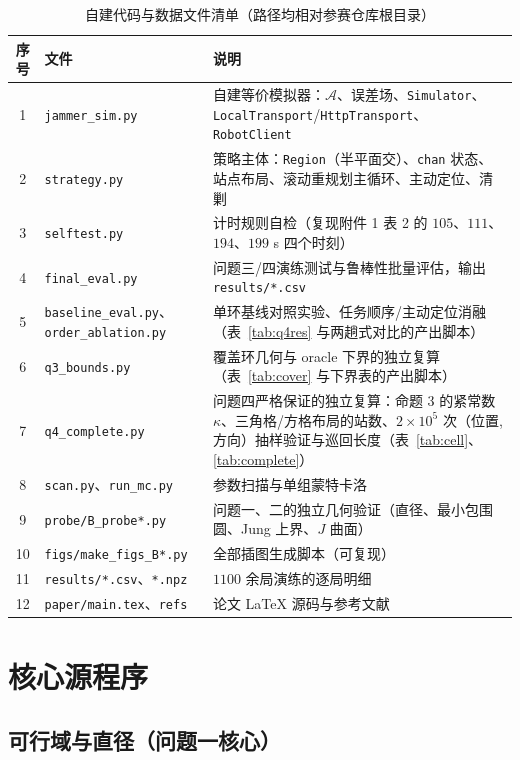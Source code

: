 \begin{table}[H]
\centering
\caption{自建代码与数据文件清单（路径均相对参赛仓库根目录）}
\label{tab:files}
\footnotesize
\setlength{\tabcolsep}{4pt}
\begin{tabular}{@{}cl >{\raggedright\arraybackslash}p{7.4cm}@{}}
\toprule
序号 & 文件 & 说明 \\
\midrule
1 & \texttt{jammer\_sim.py} & 自建等价模拟器：$\mathcal A$、误差场、\texttt{Simulator}、\texttt{LocalTransport}/\texttt{HttpTransport}、\texttt{RobotClient} \\
2 & \texttt{strategy.py} & 策略主体：\texttt{Region}（半平面交）、\texttt{chan} 状态、站点布局、滚动重规划主循环、主动定位、清剿 \\
3 & \texttt{selftest.py} & 计时规则自检（复现附件 1 表 2 的 $105$、$111$、$194$、$199$ s 四个时刻） \\
4 & \texttt{final\_eval.py} & 问题三/四演练测试与鲁棒性批量评估，输出 \texttt{results/*.csv} \\
5 & \texttt{baseline\_eval.py}、\texttt{order\_ablation.py} & 单环基线对照实验、任务顺序/主动定位消融（表~\ref{tab:q4res} 与两趟式对比的产出脚本） \\
6 & \texttt{q3\_bounds.py} & 覆盖环几何与 oracle 下界的独立复算（表~\ref{tab:cover} 与下界表的产出脚本） \\
7 & \texttt{q4\_complete.py} & 问题四严格保证的独立复算：命题 3 的紧常数 $\kappa$、三角格/方格布局的站数、$2\times10^5$ 次（位置, 方向）抽样验证与巡回长度（表~\ref{tab:cell}、\ref{tab:complete}） \\
8 & \texttt{scan.py}、\texttt{run\_mc.py} & 参数扫描与单组蒙特卡洛 \\
9 & \texttt{probe/B\_probe*.py} & 问题一、二的独立几何验证（直径、最小包围圆、Jung 上界、$J$ 曲面） \\
10 & \texttt{figs/make\_figs\_B*.py} & 全部插图生成脚本（可复现） \\
11 & \texttt{results/*.csv}、\texttt{*.npz} & $1100$ 余局演练的逐局明细 \\
12 & \texttt{paper/main.tex}、\texttt{refs} & 论文 \LaTeX{} 源码与参考文献 \\
\bottomrule
\end{tabular}
\end{table}

\section{核心源程序}

\subsection{可行域与直径（问题一核心）}

